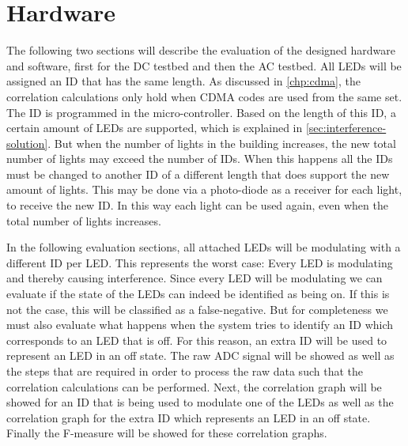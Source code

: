 
\section{Hardware}
\label{sec:hardware-evaluation}

The following two sections will describe the evaluation of the designed hardware and software, first for the DC testbed and then the AC testbed.
All LEDs will be assigned an ID that has the same length.
As discussed in \autoref{chp:cdma}, the correlation calculations only hold when CDMA codes are used from the same set.
The ID is programmed in the micro-controller.%
Based on the length of this ID, a certain amount of LEDs are supported, which is explained in \autoref{sec:interference-solution}.
But when the number of lights in the building increases, the new total number of lights may exceed the number of IDs.
When this happens all the IDs must be changed to another ID of a different length that does support the new amount of lights.
This may be done via a photo-diode as a receiver for each light, to receive the new ID.
In this way each light can be used again, even when the total number of lights increases.


In the following evaluation sections, all attached LEDs will be modulating with a different ID per LED.
This represents the worst case: Every LED is modulating and thereby causing interference.
Since every LED will be modulating we can evaluate if the state of the LEDs can indeed be identified as being on.
If this is not the case, this will be classified as a false-negative.
But for completeness we must also evaluate what happens when the system tries to identify an ID which corresponds to an LED that is off.
For this reason, an extra ID will be used to represent an LED in an off state.
The raw ADC signal will be showed as well as the steps that are required in order to process the raw data such that the correlation calculations can be performed.
Next, the correlation graph will be showed for an ID that is being used to modulate one of the LEDs as well as the correlation graph for the extra ID which represents an LED in an off state. 
Finally the F-measure will be showed for these correlation graphs.











